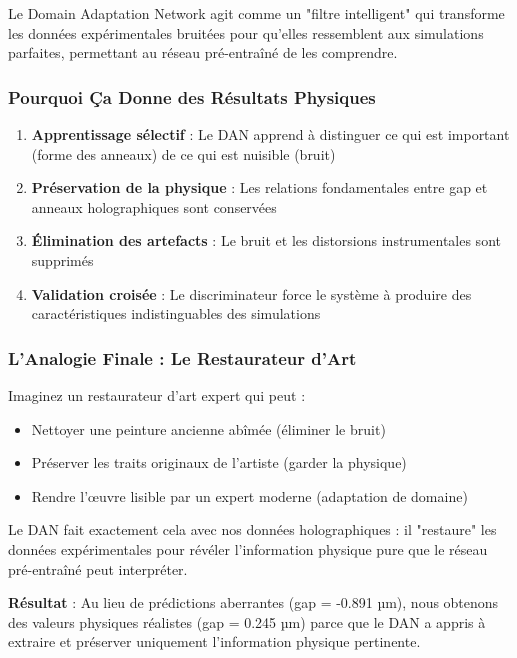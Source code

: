 \documentclass[twocolumn,10pt]{article}
\begin{document}
Le Domain Adaptation Network agit comme un "filtre intelligent" qui transforme les données expérimentales bruitées pour qu'elles ressemblent aux simulations parfaites, permettant au réseau pré-entraîné de les comprendre.

\subsubsection{Pourquoi Ça Donne des Résultats Physiques}

\begin{enumerate}
\item \textbf{Apprentissage sélectif} : Le DAN apprend à distinguer ce qui est important (forme des anneaux) de ce qui est nuisible (bruit)

\item \textbf{Préservation de la physique} : Les relations fondamentales entre gap et anneaux holographiques sont conservées

\item \textbf{Élimination des artefacts} : Le bruit et les distorsions instrumentales sont supprimés

\item \textbf{Validation croisée} : Le discriminateur force le système à produire des caractéristiques indistinguables des simulations
\end{enumerate}

\subsubsection{L'Analogie Finale : Le Restaurateur d'Art}

Imaginez un restaurateur d'art expert qui peut :
\begin{itemize}
\item Nettoyer une peinture ancienne abîmée (éliminer le bruit)
\item Préserver les traits originaux de l'artiste (garder la physique)
\item Rendre l'œuvre lisible par un expert moderne (adaptation de domaine)
\end{itemize}

Le DAN fait exactement cela avec nos données holographiques : il "restaure" les données expérimentales pour révéler l'information physique pure que le réseau pré-entraîné peut interpréter.

\textbf{Résultat} : Au lieu de prédictions aberrantes (gap = -0.891 µm), nous obtenons des valeurs physiques réalistes (gap = 0.245 µm) parce que le DAN a appris à extraire et préserver uniquement l'information physique pertinente.
\end{document}
